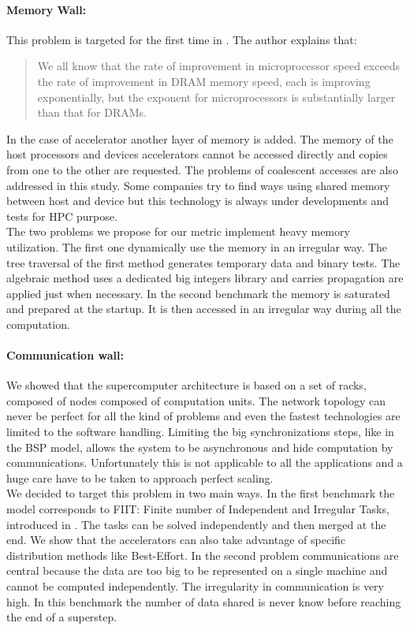 \paragraph{Memory Wall: }
This problem is targeted for the first time in \cite{wulf1995hitting}.
The author explains that:
\begin{quotation} We all know that the rate of improvement in microprocessor speed exceeds the rate of improvement in DRAM memory speed, each is improving exponentially, but the exponent for microprocessors is substantially larger than that for DRAMs.
\end{quotation}
In the case of accelerator another layer of memory is added. 
The memory of the host processors and devices accelerators cannot be accessed directly and copies from one to the other are requested.
The problems of coalescent accesses are also addressed in this study.
Some companies try to find ways using shared memory between host and device but this technology is always under developments and tests for HPC purpose. \\

The two problems we propose for our metric implement heavy memory utilization. 
The first one dynamically use the memory in an irregular way. 
The tree traversal of the first method generates temporary data and binary tests. 
The algebraic method uses a dedicated big integers library and carries propagation are applied just when necessary. 
In the second benchmark the memory is saturated and prepared at the startup.
It is then accessed in an irregular way during all the computation. 

\paragraph{Communication wall: } 
We showed that the supercomputer architecture is based on a set of racks, composed of nodes composed of computation units. 
The network topology can never be perfect for all the kind of problems and even the fastest technologies are limited to the software handling. 
Limiting the big synchronizations steps, like in the BSP model, allows the system to be asynchronous and hide computation by communications. 
Unfortunately this is not applicable to all the applications and a huge care have to be taken to approach perfect scaling.\\

We decided to target this problem in two main ways. 
In the first benchmark the model corresponds to FIIT: Finite number of Independent and Irregular Tasks, introduced in \cite{flauzac2003confiit}.
The tasks can be solved independently and then merged at the end. 
We show that the accelerators can also take advantage of specific distribution methods like Best-Effort. 
In the second problem communications are central because the data are too big to be represented on a single machine and cannot be computed independently. 
The irregularity in communication is very high.
In this benchmark the number of data shared is never know before reaching the end of a superstep.

